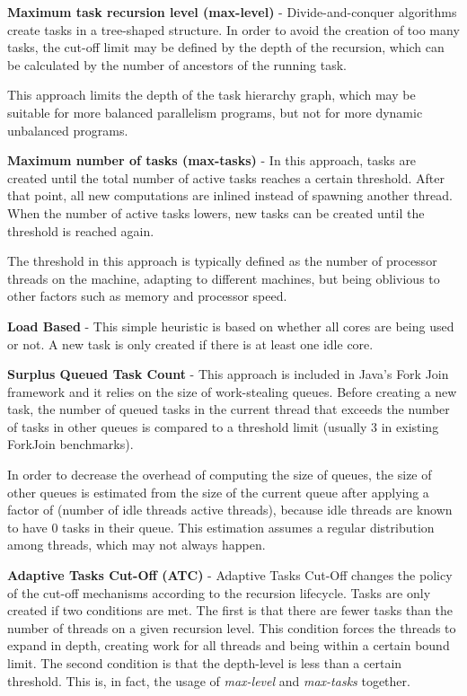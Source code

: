 \documentclass[smallextended]{svjour3}
\begin{document}
\textbf{Maximum task recursion level (max-level)} - Divide-and-conquer algorithms create tasks in a tree-shaped structure. In order to avoid the creation of too many tasks, the cut-off limit may be defined by the depth of the recursion\cite{duran2008evaluation}, which can be calculated by the number of ancestors of the running task.

This approach limits the depth of the task hierarchy graph, which may be suitable for more balanced parallelism programs, but not for more dynamic unbalanced programs.

\textbf{Maximum number of tasks (max-tasks)} - In this approach, tasks are created until the total number of active tasks reaches a certain threshold\cite{duran2008evaluation}. After that point, all new computations are inlined instead of spawning another thread. When the number of active tasks lowers, new tasks can be created until the threshold is reached again.

The threshold in this approach is typically defined as the number of processor threads on the machine, adapting to different machines, but being oblivious to other factors such as memory and processor speed.

\textbf{Load Based} - This simple heuristic is based on whether all cores are being used or not. A new task is only created if there is at least one idle core\cite{duran2008adaptive}.

\textbf{Surplus Queued Task Count} - This approach is included in Java's Fork Join framework\cite{lea2000java} and it relies on the size of work-stealing queues. Before creating a new task, the number of queued tasks in the current thread that exceeds the number of tasks in other queues is compared to a threshold limit (usually 3 in existing ForkJoin benchmarks).

In order to decrease the overhead of computing the size of queues, the size of other queues is estimated from the size of the current queue after applying a factor of (number of idle threads  active threads), because idle threads are known to have 0 tasks in their queue. This estimation assumes a regular distribution among threads, which may not always happen.

\textbf{Adaptive Tasks Cut-Off (ATC)} - Adaptive Tasks Cut-Off\cite{duran2008adaptive} changes the policy of the cut-off mechanisms according to the recursion lifecycle. Tasks are only created if two conditions are met. The first is that there are fewer tasks than the number of threads on a given recursion level. This condition forces the threads to expand in depth, creating work for all threads and being within a certain bound limit. The second condition is that the depth-level is less than a certain threshold. This is, in fact, the usage of \emph{max-level} and \emph{max-tasks} together.
\end{document}

